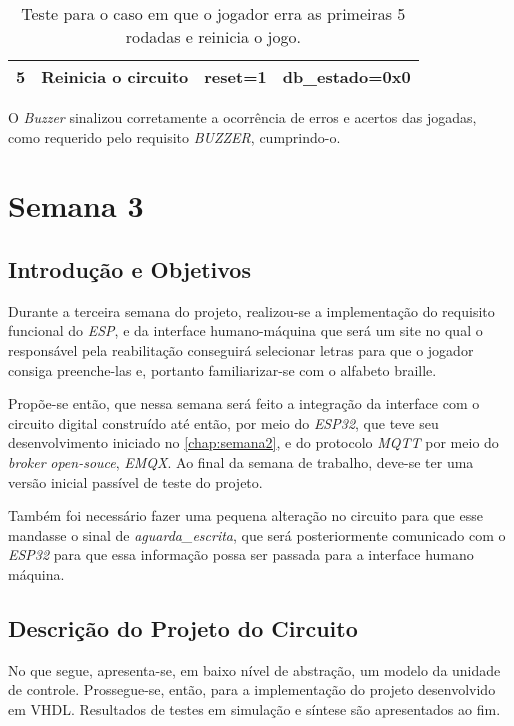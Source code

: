 \documentclass[amsmath,amssymb,floatfix]{report}
\begin{document}
\begin{table}[H]
\begin{tabular}{|cccc|}
\multicolumn{1}{|c|}{5}          & \multicolumn{1}{c|}{Reinicia o circuito} & \multicolumn{1}{c|}{reset=1}                                                            & \multicolumn{1}{c|}{db\_estado=0x0}              \\ \hline
\end{tabular}
\caption{Teste para o caso em que o jogador erra as primeiras 5 rodadas e reinicia o jogo.}
\label{tab:testbench22_exp}
\end{table}

O \textit{Buzzer} sinalizou corretamente a ocorrência de erros e acertos das jogadas, como requerido pelo requisito \textit{BUZZER}, cumprindo-o.

\chapter{Semana 3}
\label{chap:semana3}

 \section{Introdução e Objetivos}
 \label{sec:introEObjetivos3}
 Durante a terceira semana do projeto, realizou-se a implementação do requisito funcional do \textit{ESP}, e da interface humano-máquina que será um site no qual o responsável pela reabilitação conseguirá selecionar letras para que o jogador consiga preenche-las e, portanto familiarizar-se com o alfabeto braille. 

Propõe-se então, que nessa semana será feito a integração da interface com o circuito digital construído até então, por meio do \textit{ESP32}, que teve seu desenvolvimento iniciado no \ref{chap:semana2}, e do protocolo \textit{MQTT} por meio do \textit{broker} \textit{open-souce}, \textit{EMQX}. Ao final da semana de trabalho, deve-se ter uma versão inicial passível de teste do projeto. 

Também foi necessário fazer uma pequena alteração no circuito para que esse mandasse o sinal de \textit{aguarda\_escrita}, que será posteriormente comunicado com o \textit{ESP32} para que essa informação possa ser passada para a interface humano máquina.

\section{Descrição do Projeto do Circuito}
\label{sec:descricaoDoProjetoCircuito3}

No que segue, apresenta-se, em baixo nível de abstração, um modelo da unidade de controle. Prossegue-se, então, para a implementação do projeto desenvolvido em VHDL. Resultados de testes em simulação e síntese são apresentados ao fim.
\end{document}
